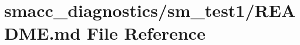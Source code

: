 \hypertarget{smacc__diagnostics_2sm__test1_2README_8md}{}\section{smacc\+\_\+diagnostics/sm\+\_\+test1/\+R\+E\+A\+D\+ME.md File Reference}
\label{smacc__diagnostics_2sm__test1_2README_8md}
